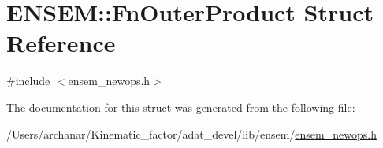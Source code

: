 \hypertarget{structENSEM_1_1FnOuterProduct}{}\section{E\+N\+S\+EM\+:\+:Fn\+Outer\+Product Struct Reference}
\label{structENSEM_1_1FnOuterProduct}


{\ttfamily \#include $<$ensem\+\_\+newops.\+h$>$}



The documentation for this struct was generated from the following file\+:\begin{DoxyCompactItemize}
\item 
/\+Users/archanar/\+Kinematic\+\_\+factor/adat\+\_\+devel/lib/ensem/\mbox{\hyperlink{lib_2ensem_2ensem__newops_8h}{ensem\+\_\+newops.\+h}}\end{DoxyCompactItemize}
